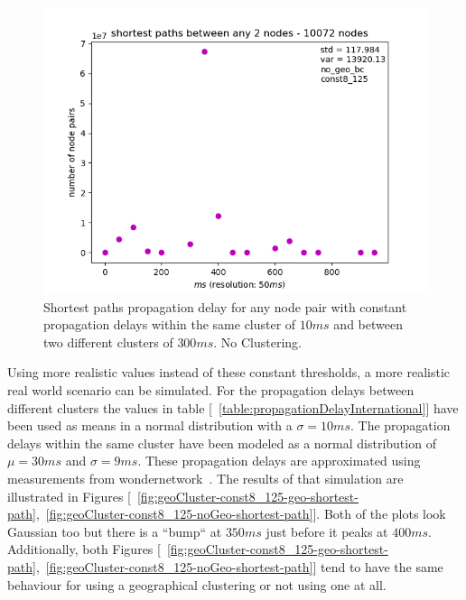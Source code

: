 \documentclass[a4paper, oneside]{discothesis}
\begin{document}
\begin{figure}
    \centering
    \includegraphics[width=.8\columnwidth]{figures/geoCluster/tConst10-300/noGeo/final-shortest-paths-between-any-nodes-10072-nodes.png}
    \caption{Shortest paths propagation delay for any node pair with constant propagation delays within the same cluster of $10ms$ and between two different clusters of $300ms$. No Clustering.}
    \label{fig:geoCluster-tConst10-300-noGeo-shortest-path}
\end{figure}

Using more realistic values instead of these constant thresholds, a more realistic real world scenario can be simulated. For the propagation delays between different clusters the values in table [~\ref{table:propagationDelayInternational}] have been used as means in a normal distribution with a $\sigma = 10ms$. The propagation delays within the same cluster have been modeled as a normal distribution of $\mu = 30ms$ and $\sigma = 9ms$. These propagation delays are approximated using measurements from wondernetwork~\cite{pingLookup}.
The results of that simulation are illustrated in Figures [~\ref{fig:geoCluster-const8_125-geo-shortest-path},~\ref{fig:geoCluster-const8_125-noGeo-shortest-path}]. Both of the plots look Gaussian too but there is a ``bump`` at $350ms$ just before it peaks at $400ms$. Additionally, both Figures [~\ref{fig:geoCluster-const8_125-geo-shortest-path},~\ref{fig:geoCluster-const8_125-noGeo-shortest-path}] tend to have the same behaviour for using a geographical clustering or not using one at all.
\end{document}
